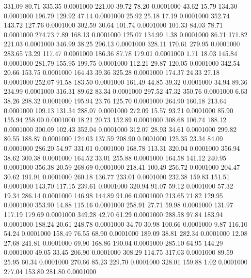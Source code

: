  331.09   80.71  335.35   0.0001000
 221.00   39.72   78.20   0.0001000
  43.62   15.79  134.30   0.0001000
 196.79  129.92   47.14   0.0001000
  25.92   25.18   17.19   0.0001000
 352.74  143.72  127.76   0.0001000
 302.59   30.64  101.74   0.0001000
 101.33   84.03   78.71   0.0001000
 274.73    7.89  168.13   0.0001000
 125.07  134.99    1.38   0.0001000
  86.71  171.82  221.03   0.0001000
 346.99   38.25  296.13   0.0001000
 328.11  170.61  279.95   0.0001000
 283.65   73.29  117.47   0.0001000
 186.36   87.78  179.01   0.0001000
   1.71   18.03  145.84   0.0001000
 281.79  155.95  199.75   0.0001000
 112.21   29.87  120.05   0.0001000
 342.54   20.66  153.75   0.0001000
 164.43   39.36  325.28   0.0001000
 174.37   24.33   27.18   0.0001000
 252.07   91.58  183.50   0.0001000
 161.49   44.85   39.32   0.0001000
  34.94   89.36  234.99   0.0001000
 316.31   89.62   83.34   0.0001000
 297.52   47.32  350.76   0.0001000
   6.63   38.26  298.32   0.0001000
 195.94   23.76  125.70   0.0001000
 264.90  160.18  213.64   0.0001000
 109.13  131.34  288.07   0.0001000
 272.09   15.57   93.21   0.0001000
  85.90  155.94  258.00   0.0001000
  18.21   20.73  152.89   0.0001000
 308.68  106.74  188.12   0.0001000
 300.09  102.43  352.04   0.0001000
 312.07   28.93   34.61   0.0001000
 299.82   80.55  188.87   0.0001000
 124.03  137.59  208.90   0.0001000
 125.35   23.34   84.09   0.0001000
 286.20   54.97  331.01   0.0001000
 168.78  113.31  320.04   0.0001000
 356.94   38.62  300.38   0.0001000
 164.52   33.01  255.88   0.0001000
 164.58  141.12  240.95   0.0001000
 356.38   20.59  268.69   0.0001000
 218.41  100.49  256.72   0.0001000
 204.47   30.62  191.91   0.0001000
 260.18  136.77  233.01   0.0001000
 232.38  159.83  151.51   0.0001000
 143.70  117.15  239.61   0.0001000
 320.94   91.07   59.12   0.0001000
  57.32   19.34  286.14   0.0001000
 146.98  144.89   91.06   0.0001000
 213.65   71.82  129.95   0.0001000
 353.90   14.88  115.16   0.0001000
 258.91   27.71   59.98   0.0001000
 131.97  117.19  179.69   0.0001000
 349.28   42.70   61.29   0.0001000
 288.58   97.84  183.94   0.0001000
 188.24   20.61  248.78   0.0001000
  34.70   30.98  100.66   0.0001000
   9.87  116.10   54.24   0.0001000
 158.49   76.55   68.90   0.0001000
 189.09   38.81  282.34   0.0001000
  12.08   27.68  241.81   0.0001000
  69.90  168.86  190.04   0.0001000
 285.10   64.95  144.29   0.0001000
  49.05   33.45  206.90   0.0001000
 308.29  114.75  317.03   0.0001000
  89.59   25.95   60.34   0.0001000
 270.66   85.23  229.70   0.0001000
 328.01  159.88    1.02   0.0001000
 277.04  153.80  281.80   0.0001000
